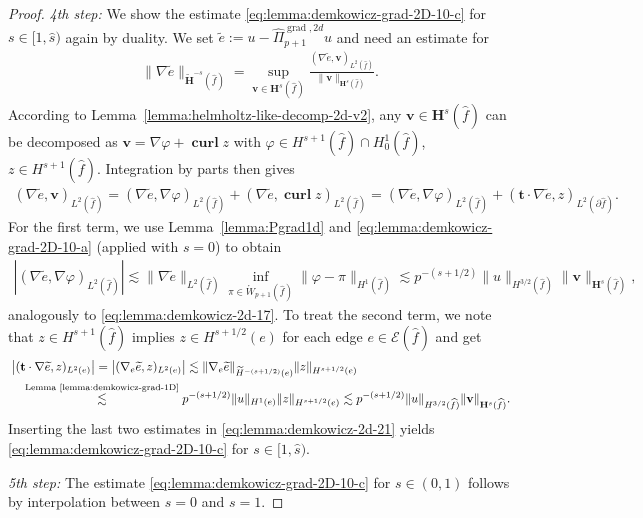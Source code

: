 \documentclass{article}
\newcommand{\hatPigradcomtwod}{\widehat\Pi^{\operatorname*{grad},2d}_{p+1}}
\begin{document}
\begin{proof}
\emph{4th step:}
We show the estimate \eqref{eq:lemma:demkowicz-grad-2D-10-c} for $s\in [1,\widehat{s})$ again by duality. We set $\widetilde{e}:=u-\hatPigradcomtwod u$ and need an estimate for
\begin{align}
\label{eq:lemma:demkowicz-2d-21}
\|\nabla\widetilde{e}\|_{\widetilde{\mathbf{H}}^{-s}(\widehat{f})} = \operatorname*{sup}_{\mathbf{v}\in \mathbf{H}^s(\widehat{f})} \frac{(\nabla\widetilde{e},\mathbf{v})_{L^2(\widehat{f})}}{\|\mathbf{v}\|_{\mathbf{H}^s(\widehat{f})}}.
\end{align}
According to Lemma~\ref{lemma:helmholtz-like-decomp-2d-v2}, any $\mathbf{v}\in \mathbf{H}^s(\widehat{f})$ can be decomposed as $\mathbf{v}=\nabla\varphi+\operatorname{\mathbf{curl}} z$ with 
$\varphi \in H^{s+1}(\widehat{f}) \cap H^1_0(\widehat{f})$,  
$z\in H^{s+1}(\widehat{f})$. Integration by parts then gives
\begin{align*}
(\nabla\widetilde{e},\mathbf{v})_{L^2(\widehat{f})} \!=\! (\nabla\widetilde{e},\nabla\varphi)_{L^2(\widehat{f})} \!+\! (\nabla\widetilde{e},\operatorname{\mathbf{curl}} z)_{L^2(\widehat{f})} \!=\! (\nabla\widetilde{e},\nabla\varphi)_{L^2(\widehat{f})} \!+\! (\mathbf{t}\cdot \nabla\widetilde{e},z)_{L^2(\partial\widehat{f})}.
\end{align*}
For the first term, we use Lemma~\ref{lemma:Pgrad1d} and \eqref{eq:lemma:demkowicz-grad-2D-10-a} 
(applied with $s=0$) to obtain
\begin{align*}
\left| (\nabla\widetilde{e},\nabla\varphi)_{L^2(\widehat{f})}\right|\! \lesssim \|\nabla\widetilde{e}\|_{L^2(\widehat{f})} \!\inf_{\pi\in \mathring{W}_{p+1}(\widehat{f})}\!\! \|\varphi-\pi\|_{H^1(\widehat{f})} \lesssim p^{-(s+1/2)} \|u\|_{H^{3/2}(\widehat{f})} \|\mathbf{v}\|_{\mathbf{H}^s(\widehat{f})},
\end{align*}
analogously to \eqref{eq:lemma:demkowicz-2d-17}. To treat the second term, 
we note that $z\in H^{s+1}(\widehat{f})$ implies $z\in H^{s+1/2}(e)$ 
for each edge $e\in\mathcal{E}(\widehat{f})$ and get
\begin{align*}
&\left| (\mathbf{t}\cdot \nabla\widetilde{e},z)_{L^2(e)}\right| = 
\left| (\nabla_e\widetilde{e},z)_{L^2(e)} \right| 
\lesssim \|\nabla_e \widetilde{e}\|_{\widetilde{H}^{-(s+1/2)}(e)} \|z\|_{H^{s+1/2}(e)} \\
&\quad \stackrel{\text{Lemma~\ref{lemma:demkowicz-grad-1D}}}{\lesssim} p^{-(s+1/2)} \|u\|_{H^1(e)} \|z\|_{H^{s+1/2}(e)} \lesssim p^{-(s+1/2)} \|u\|_{H^{3/2}(\widehat{f})} \|\mathbf{v}\|_{\mathbf{H}^s(\widehat{f})}.
\end{align*}
Inserting the last two estimates in \eqref{eq:lemma:demkowicz-2d-21} yields \eqref{eq:lemma:demkowicz-grad-2D-10-c} for $s\in [1,\widehat{s})$. 

\emph{5th step:}
The estimate \eqref{eq:lemma:demkowicz-grad-2D-10-c} for $s\in (0,1)$ follows by interpolation between 
$s = 0$ and $s = 1$. 
\end{proof}
\end{document}
